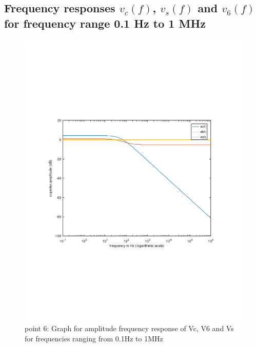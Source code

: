 \subsection{Frequency responses $v_c(f)$, $v_s(f)$ and $v_6(f)$ for frequency range 0.1 Hz to 1 MHz}
\begin{figure}[h!] \centering
\includegraphics[width=0.9\linewidth]{freq_resp_tab.pdf}
\caption{point 6: Graph for amplitude frequency response of Vc, V6 and Vs for frequencies ranging from 0.1Hz to 1MHz}
\label{fig:freq_resp}
\end{figure}

\vspace{15cm}

